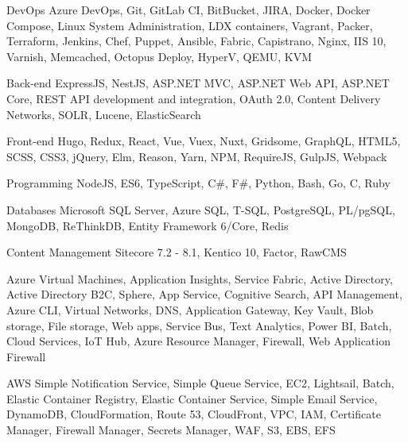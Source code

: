 

\begin{cvskills}

  \cvskill
    {DevOps} %
    {Azure DevOps, Git, GitLab CI, BitBucket, JIRA, Docker, Docker Compose, Linux System Administration, LDX containers, Vagrant, Packer, Terraform, Jenkins, Chef, Puppet, Ansible, Fabric, Capistrano, Nginx, IIS 10, Varnish, Memcached, Octopus Deploy, HyperV, QEMU, KVM} %

  \cvskill
    {Back-end} %
    {ExpressJS, NestJS, ASP.NET MVC, ASP.NET Web API, ASP.NET Core, REST API development and integration, OAuth 2.0, Content Delivery Networks, SOLR, Lucene, ElasticSearch} %

  \cvskill
    {Front-end} %
    {Hugo, Redux, React, Vue, Vuex, Nuxt, Gridsome, GraphQL, HTML5, SCSS, CSS3, jQuery, Elm, Reason, Yarn, NPM, RequireJS, GulpJS, Webpack} %

  \cvskill
    {Programming} %
    {NodeJS, ES6, TypeScript, C\#, F\#, Python, Bash, Go, C, Ruby} %

  \cvskill
    {Databases} %
    {Microsoft SQL Server, Azure SQL, T-SQL, PostgreSQL, PL/pgSQL, MongoDB, ReThinkDB, Entity Framework 6/Core, Redis} %

  \cvskill
    {Content Management} %
    {Sitecore 7.2 - 8.1, Kentico 10, Factor, RawCMS} %

  \cvskill
    {Azure} %
    {Virtual Machines, Application Insights, Service Fabric, Active Directory, Active Directory B2C, Sphere, App Service, Cognitive Search, API Management, Azure CLI, Virtual Networks, DNS, Application Gateway, Key Vault, Blob storage, File storage, Web apps, Service Bus, Text Analytics, Power BI, Batch, Cloud Services, IoT Hub, Azure Resource Manager, Firewall, Web Application Firewall} %

  \cvskill
    {AWS} %
    {Simple Notification Service, Simple Queue Service, EC2, Lightsail, Batch, Elastic Container Registry, Elastic Container Service, Simple Email Service, DynamoDB, CloudFormation, Route 53, CloudFront, VPC, IAM, Certificate Manager, Firewall Manager, Secrets Manager, WAF, S3, EBS, EFS} %

\end{cvskills}
